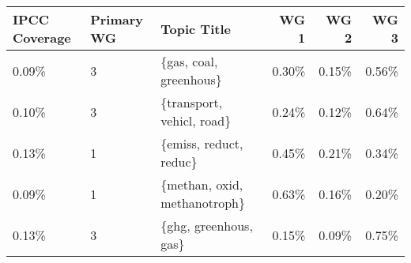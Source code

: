 \begin{tabular}{p{1.4cm} p{1cm} l r r r}
\toprule
 IPCC Coverage &  Primary WG &                   Topic Title &  WG 1 &  WG 2 &  WG 3 \\
\midrule
         0.09\% &           3 &        \{gas, coal, greenhous\} & 0.30\% & 0.15\% & 0.56\% \\
         0.10\% &           3 &     \{transport, vehicl, road\} & 0.24\% & 0.12\% & 0.64\% \\
         0.13\% &           1 &        \{emiss, reduct, reduc\} & 0.45\% & 0.21\% & 0.34\% \\
         0.09\% &           1 &  \{methan, oxid, methanotroph\} & 0.63\% & 0.16\% & 0.20\% \\
         0.13\% &           3 &         \{ghg, greenhous, gas\} & 0.15\% & 0.09\% & 0.75\% \\
\bottomrule
\end{tabular}
